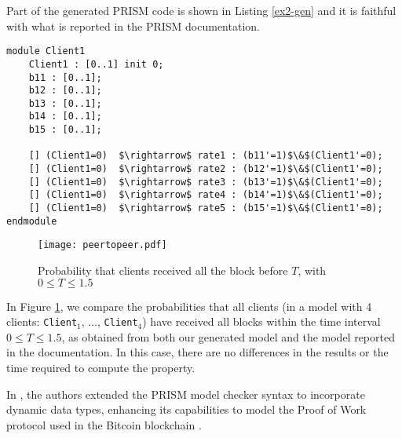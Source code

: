 Part of the generated PRISM code is shown in Listing \ref{ex2-gen} and it is faithful with what is reported in the PRISM documentation. 
\begin{lstlisting}[style=prism-color,caption={Generated PRISM program for the Peer-To-Peer Protocol},captionpos=b,label={ex2-gen}]
module Client1
	Client1 : [0..1] init 0;
	b11 : [0..1]; 
	b12 : [0..1]; 
	b13 : [0..1]; 
	b14 : [0..1]; 
	b15 : [0..1]; 

	[] (Client1=0)  $\rightarrow$ rate1 : (b11'=1)$\&$(Client1'=0); 
	[] (Client1=0)  $\rightarrow$ rate2 : (b12'=1)$\&$(Client1'=0); 
	[] (Client1=0)  $\rightarrow$ rate3 : (b13'=1)$\&$(Client1'=0); 
	[] (Client1=0)  $\rightarrow$ rate4 : (b14'=1)$\&$(Client1'=0); 
	[] (Client1=0)  $\rightarrow$ rate5 : (b15'=1)$\&$(Client1'=0); 
endmodule
\end{lstlisting}
\begin{figure}[h]
   \centering
   \texttt{[image: peertopeer.pdf]}	
   \caption{Probability that clients received all the block before $T$, with $0\leq T \leq 1.5$}
   \label{ex2-res}
   \end{figure}
   
In Figure \ref{ex2-res}, we compare the probabilities that all clients (in a model with 4 clients: \texttt{Client$_1$}, $\ldots$, \texttt{Client$_4$}) have received all blocks within the time interval $0 \leq T \leq 1.5$, as obtained from both our generated model and the model reported in the documentation. In this case, there are no differences in the results or the time required to compute the property.

In \cite{DBLP:journals/concurrency/BistarelliNGLMV23}, the authors extended the PRISM model checker syntax to incorporate dynamic data types, enhancing its capabilities to model the Proof of Work protocol used in the Bitcoin blockchain \cite{bitcoin}. 

